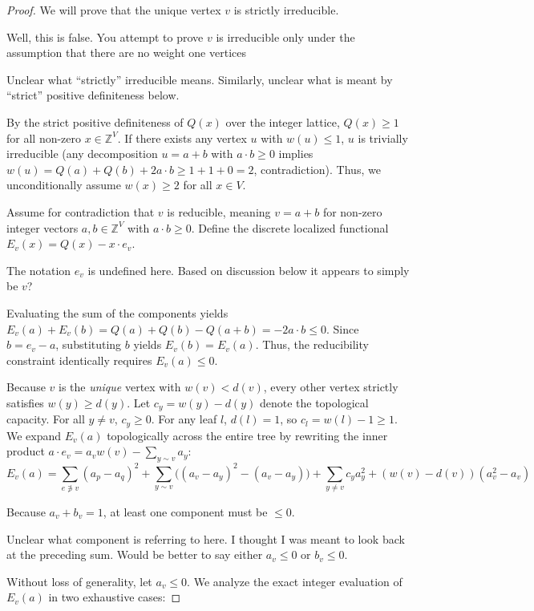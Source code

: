 \documentclass[12pt]{article}
\newcommand{\review}[1]{\begin{reviewbox}#1\end{reviewbox}}
\begin{document}
\begin{proof}
We will prove that the unique vertex $v$ is strictly irreducible.
\review{Well, this is false. You attempt to prove $v$ is irreducible only under the assumption that there are no weight one vertices}
\review{Unclear what ``strictly'' irreducible means. Similarly, unclear what is meant by ``strict'' positive definiteness below.}
By the strict positive definiteness of $Q(x)$ over the integer lattice, $Q(x) \ge 1$ for all non-zero $x \in \mathbb{Z}^V$. If there exists any vertex $u$ with $w(u) \le 1$, $u$ is trivially irreducible (any decomposition $u = a+b$ with $a \cdot b \ge 0$ implies $w(u) = Q(a) + Q(b) + 2a \cdot b \ge 1 + 1 + 0 = 2$, contradiction). Thus, we unconditionally assume $w(x) \ge 2$ for all $x \in V$.

Assume for contradiction that $v$ is reducible, meaning $v = a + b$ for non-zero integer vectors $a, b \in \mathbb{Z}^V$ with $a \cdot b \ge 0$.
Define the discrete localized functional $E_v(x) = Q(x) - x \cdot e_v$. 
\review{The notation $e_v$ is undefined here. Based on discussion below it appears to simply be $v$?}
Evaluating the sum of the components yields $E_v(a) + E_v(b) = Q(a) + Q(b) - Q(a+b) = -2a \cdot b \le 0$. 
Since $b = e_v - a$, substituting $b$ yields $E_v(b) = E_v(a)$. Thus, the reducibility constraint identically requires $E_v(a) \le 0$.

Because $v$ is the \emph{unique} vertex with $w(v) < d(v)$, every other vertex strictly satisfies $w(y) \ge d(y)$. Let $c_y = w(y) - d(y)$ denote the topological capacity. For all $y \ne v$, $c_y \ge 0$. For any leaf $l$, $d(l) = 1$, so $c_l = w(l) - 1 \ge 1$.
We expand $E_v(a)$ topologically across the entire tree by rewriting the inner product $a \cdot e_v = a_v w(v) - \sum_{y \sim v} a_y$:
\[
E_v(a) = \sum_{e \not\ni v} (a_p - a_q)^2 + \sum_{y \sim v} \big( (a_v - a_y)^2 - (a_v - a_y) \big) + \sum_{y \ne v} c_y a_y^2 + (w(v) - d(v))(a_v^2 - a_v)
\]

Because $a_v + b_v = 1$, at least one component must be $\le 0$. 
\review{Unclear what component is referring to here. I thought I was meant to look back at the preceding sum. Would be better to say either $a_v\leq 0$ or $b_v\leq 0$.}
Without loss of generality, let $a_v \le 0$.
We analyze the exact integer evaluation of $E_v(a)$ in two exhaustive cases:


\end{proof}
\end{document}
